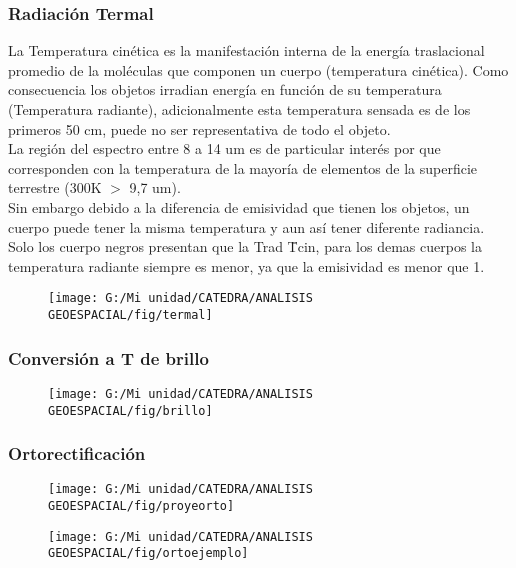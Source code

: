 \documentclass[14pt]{beamer}
\begin{document}
\begin{frame}
\frametitle{Radiación Termal}
\scriptsize{La Temperatura cinética es la manifestación interna de la energía traslacional promedio de la moléculas que componen un cuerpo (temperatura cinética). Como consecuencia  los objetos irradian energía en función de su temperatura (Temperatura radiante), adicionalmente esta temperatura sensada es de los primeros 50 cm, puede no ser representativa de todo el objeto.\\
La región del espectro entre 8 a 14 um es de particular interés  por que corresponden con la temperatura de la mayoría de elementos de la superficie terrestre (300K $>$ 9,7 um).\\
Sin embargo debido a la diferencia de emisividad que tienen los objetos, un cuerpo puede tener la misma temperatura y aun así tener diferente radiancia. Solo los cuerpo negros presentan que la Trad \= Tcin, para los demas cuerpos la temperatura radiante siempre es menor, ya que la emisividad es menor que 1.}
\begin{figure}
    \centering
    \texttt{[image: G:/Mi unidad/CATEDRA/ANALISIS GEOESPACIAL/fig/termal]}
  \end{figure}
\end{frame}
\begin{frame}
\frametitle{Conversión a T de brillo }
\scriptsize{}
  \begin{figure}
    \centering
    \texttt{[image: G:/Mi unidad/CATEDRA/ANALISIS GEOESPACIAL/fig/brillo]}
  \end{figure}
\end{frame}
\begin{frame}
\frametitle{Ortorectificación}
\scriptsize{}
  \begin{figure}
    \centering
    \texttt{[image: G:/Mi unidad/CATEDRA/ANALISIS GEOESPACIAL/fig/proyeorto]}
  \end{figure}
\end{frame}
\begin{frame}
\scriptsize{}
  \begin{figure}
    \centering
    \texttt{[image: G:/Mi unidad/CATEDRA/ANALISIS GEOESPACIAL/fig/ortoejemplo]}
  \end{figure}
\end{frame}
\end{document}
